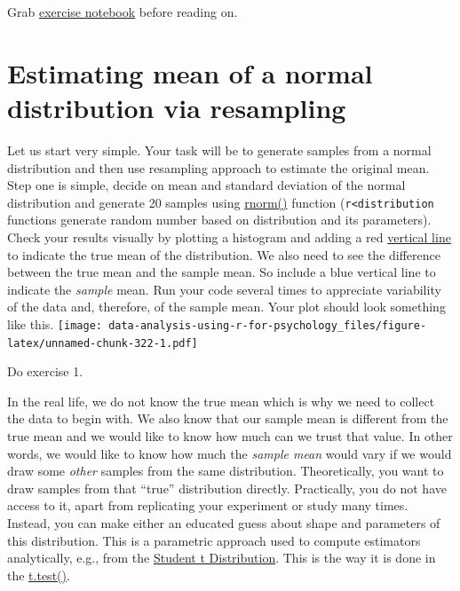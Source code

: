 \documentclass[
]{book}
\begin{document}
Grab \href{notebooks/Seminar\%2013\%20-\%20resampling.Rmd}{exercise notebook} before reading on.

\hypertarget{estimating-mean-of-a-normal-distribution-via-resampling}{%
\section{Estimating mean of a normal distribution via resampling}\label{estimating-mean-of-a-normal-distribution-via-resampling}}

Let us start very simple. Your task will be to generate samples from a normal distribution and then use resampling approach to estimate the original mean. Step one is simple, decide on mean and standard deviation of the normal distribution and generate 20 samples using \href{https://stat.ethz.ch/R-manual/R-devel/library/stats/html/Normal.html}{rnorm()} function (\texttt{r\textless{}distribution} functions generate random number based on distribution and its parameters). Check your results visually by plotting a histogram and adding a red \href{https://ggplot2.tidyverse.org/reference/geom_abline.html}{vertical line} to indicate the true mean of the distribution. We also need to see the difference between the true mean and the sample mean. So include a blue vertical line to indicate the \emph{sample} mean. Run your code several times to appreciate variability of the data and, therefore, of the sample mean.
Your plot should look something like this.
\texttt{[image: data-analysis-using-r-for-psychology\_files/figure-latex/unnamed-chunk-322-1.pdf]}

Do exercise 1.

In the real life, we do not know the true mean which is why we need to collect the data to begin with. We also know that our sample mean is different from the true mean and we would like to know how much can we trust that value. In other words, we would like to know how much the \emph{sample mean} would vary if we would draw some \emph{other} samples from the same distribution. Theoretically, you want to draw samples from that ``true'' distribution directly. Practically, you do not have access to it, apart from replicating your experiment or study many times. Instead, you can make either an educated guess about shape and parameters of this distribution. This is a parametric approach used to compute estimators analytically, e.g., from the \href{https://stat.ethz.ch/R-manual/R-devel/library/stats/html/TDist.html}{Student t Distribution}. This is the way it is done in the \href{https://stat.ethz.ch/R-manual/R-devel/library/stats/html/t.test.html}{t.test()}.
\end{document}
